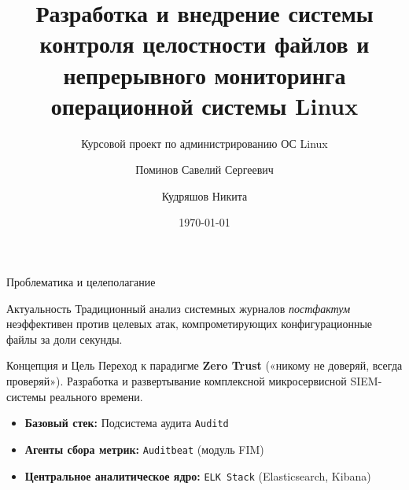 \documentclass[10pt,pdftex,aspectratio=169]{beamer}
\title[Контроль целостности Linux]{Разработка и внедрение системы контроля целостности файлов и непрерывного мониторинга операционной системы Linux}
\subtitle{Курсовой проект по администрированию ОС Linux}
\author[Поминов, Кудряшов]{Поминов Савелий Сергеевич \and Кудряшов Никита}
\institute[Инженерная группа]{Физический факультет}
\date{\today}
\begin{document}
\begin{frame}
    \titlepage
\end{frame}

\begin{frame}{Проблематика и целеполагание}
    \begin{block}{Актуальность}
        Традиционный анализ системных журналов \textit{постфактум} неэффективен против целевых атак, компрометирующих конфигурационные файлы за доли секунды.
    \end{block}
    \vfill
    \begin{block}{Концепция и Цель}
        Переход к парадигме \textbf{Zero Trust} («никому не доверяй, всегда проверяй»). Разработка и развертывание комплексной микросервисной SIEM-системы реального времени.
    \end{block}
    \vfill
    \begin{itemize}
        \item \textbf{Базовый стек:} Подсистема аудита \texttt{Auditd}
        \item \textbf{Агенты сбора метрик:} \texttt{Auditbeat} (модуль FIM)
        \item \textbf{Центральное аналитическое ядро:} \texttt{ELK Stack} (Elasticsearch, Kibana)
    \end{itemize}
\end{frame}
\end{document}
